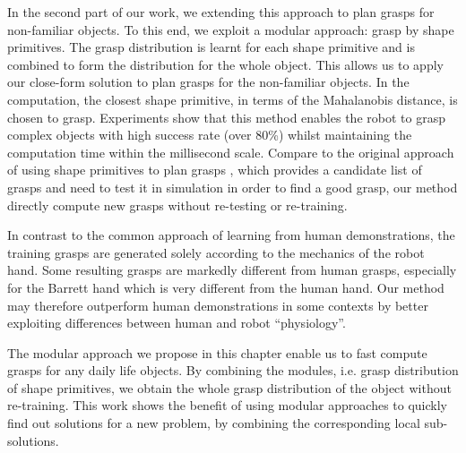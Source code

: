 In the second part of our work, we extending this approach to plan grasps for non-familiar objects.
To this end, we exploit a modular approach: grasp by shape primitives. The grasp distribution is learnt for each shape primitive and is combined to form the distribution for the whole object. This allows us to apply our close-form solution to plan grasps for the non-familiar objects. In the computation, the closest shape primitive, in terms of the Mahalanobis distance, is chosen to grasp.
Experiments show that this method enables the robot to grasp complex objects with high success rate (over 80\%) whilst maintaining the computation time within the millisecond scale. Compare to the original approach of using shape primitives to plan grasps \citep{miller2003automatic}, which provides a candidate list of grasps and need to test it in simulation in order to find a good grasp, our method directly compute new grasps without re-testing or re-training.

In contrast to the common approach of learning from human demonstrations,
the training grasps are generated solely according to the mechanics of the robot hand.
Some resulting grasps are markedly different from human grasps, especially for the Barrett hand which is very different from the human hand.
Our method may therefore outperform human demonstrations in some
contexts by better exploiting differences between human and robot ``physiology''.

The modular approach we propose in this chapter enable us to fast compute grasps for any daily life objects. By combining the modules, i.e. grasp distribution of shape primitives, we obtain the whole grasp distribution of the object without re-training. This work shows the benefit of using modular approaches to quickly find out solutions for a new problem, by combining the corresponding local sub-solutions.

